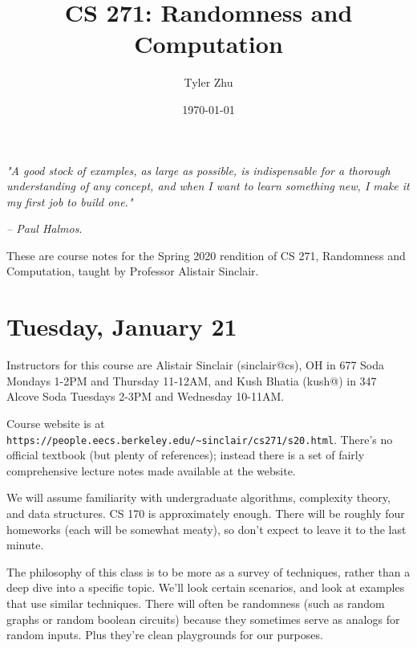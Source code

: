 \documentclass[11 pt]{scrartcl}
\begin{document}
 
\title{\Large CS 271: Randomness and Computation}
\author{\large Tyler Zhu}
\date{\large\today}

\maketitle 

\begin{center}
\begin{displayquote}
    \emph{"A good stock of examples, as large as possible, is indispensable for a thorough understanding of any concept, and when I want to learn something new, I make it my first job to build one."} \\ \begin{flushright} \emph{– Paul Halmos}.  \end{flushright}
\end{displayquote}
\end{center}


These are course notes for the Spring 2020 rendition of CS 271, Randomness and Computation, taught by Professor Alistair Sinclair.

\tableofcontents 

\newpage

\section{Tuesday, January 21}

Instructors for this course are Alistair Sinclair (sinclair@cs), OH in 677 Soda Mondays 1-2PM and Thursday 11-12AM, and Kush Bhatia (kush@) in 347 Alcove Soda Tuesdays 2-3PM and Wednesday 10-11AM. 

Course website is at \texttt{https://people.eecs.berkeley.edu/\textasciitilde{}sinclair/cs271/s20.html}. There's no official textbook (but plenty of references); instead there is a set of fairly comprehensive lecture notes made available at the website.  

We will assume familiarity with undergraduate algorithms, complexity theory, and data structures. CS 170 is approximately enough. There will be roughly four homeworks (each will be somewhat meaty), so don't expect to leave it to the last minute. 

The philosophy of this class is to be more as a survey of techniques, rather than a deep dive into a specific topic. We'll look certain scenarios, and look at examples that use similar techniques. There will often be randomness (such as random graphs or random boolean circuits) because they sometimes serve as analogs for random inputs. Plus they're clean playgrounds for our purposes. 
\end{document}
